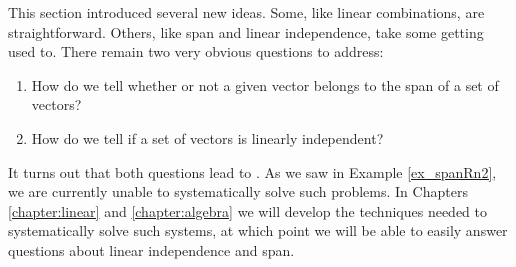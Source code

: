 \smallskip


\medskip

This section introduced several new ideas. Some, like linear combinations, are straightforward. Others, like span and linear independence, take some getting used to. There remain two very obvious questions to address:
\begin{enumerate}
\item How do we tell whether or not a given vector belongs to the span of a set of vectors?
\item How do we tell if a set of vectors is linearly independent?
\end{enumerate}
It turns out that both questions lead to . As we saw in Example \ref{ex_spanRn2}, we are currently unable to systematically solve such problems.  In Chapters \ref{chapter:linear} and \ref{chapter:algebra} we will develop the techniques needed to systematically solve such systems, at which point we will be able to easily answer questions about linear independence and span.

